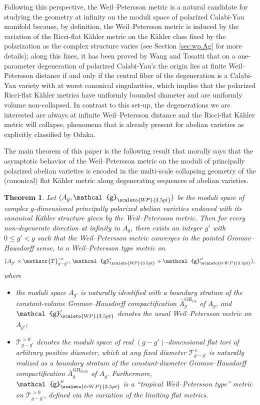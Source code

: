 \documentclass[11pt]{amsart}
\theoremstyle{plain}
\newtheorem{theorem}{Theorem}[section]
\theoremstyle{definition}
\theoremstyle{remark}
\newcommand{\g}{\mathcal{g}}
\newcommand{\WP}{\scaleto{W\!P}{3.5pt}}
\newcommand{\cT}[1]{\mathscr{T}_{#1}^{\scriptscriptstyle{>0}}}
\newcommand{\cTf}[2]{\mathscr{T}_{#1}^{\,{#2}}}
\begin{document}
Following this perspective, the Weil--Petersson metric is a natural candidate for studying the geometry at infinity on the moduli space of polarized Calabi-Yau manifold because, by definition, the Weil--Petersson metric is induced by the variation of the Ricci-flat Kähler metric on the K\"ahler class fixed by the polarization as the complex structure varies (see Section \ref{sec:wp.Ag} for more details); along this lines, it has been proved by Wang \cite{Wang97} and Tosatti \cite{Tosatti15} that on a one-parameter degeneration of polarized Calabi-Yau's the origin lies at finite Weil--Petersson distance if and only if the central fiber of the degeneration is a Calabi-Yau variety with at worst canonical singularities, which implies that the polarized Ricci-flat Kähler metrics have uniformly bounded diameter and are uniformly volume non-collapsed. In contrast to this set-up, the degenerations we are interested are always at infinite Weil--Petersson distance and the Ricci-flat Kähler metric will collapse, phenomena that is already present for abelian varieties as explicitly classified by Odaka.

The main theorem of this paper is the following result that morally says that the asymptotic behavior of the Weil--Petersson metric on the moduli of principally polarized abelian varieties is encoded in the multi-scale collapsing geometry of the (canonical) flat K\"ahler metric along degenerating sequences of abelian varieties. 
\begin{theorem}
\label{thm:main.theorem}
    Let $(A_g,\g_{\WP})$ be the moduli space of complex $g$-dimensional principally polarized abelian varieties endowed with its canonical Kähler structure given by the Weil--Petersson metric. Then for every non-degenerate direction at infinity in $A_g$, there exists an integer $g'$ with $0\leq g'<g$ such that the Weil--Petersson metric converges in the pointed Gromov--Hausdorff sense, to a Weil--Petersson type metric on
    \begin{equation}
        (A_{g'}\times \cT{g-g'},\, \g'_{\WP}+ \g''_{\scaleto{trWP}{3.5pt}}),
    \end{equation}
    where
    \begin{itemize}[leftmargin=2em]
         \item the moduli space $A_{g'}$ is naturally identified with a boundary stratum of the constant-volume Gromov--Hausdorff compactification $\bar{A}_g^{\mathrm{GH}_{\mathrm{vol}}}$ of $A_g$, and $\g'_{\WP}$ denotes the usual Weil--Petersson metric on $A_{g'}$;
         
         \item $\cT{g-g'}$ denotes the moduli space of real $(g-g')$-dimensional flat tori of arbitrary positive diameter, which at any fixed diameter $\cTf{g-g'}{c}$ is naturally realized as a boundary stratum of the constant-diameter Gromov--Hausdorff compactification $\bar{A}_g^{\mathrm{GH}_{\mathrm{diam}}}$ of $A_g$. Furthermore, $\g''_{\scaleto{trWP}{3.5pt}}$ is a ``tropical Weil--Petersson type'' metric on $\cT{g-g'}$, defined via the variation of the limiting flat metrics.
    \end{itemize}
\end{theorem}
\end{document}
